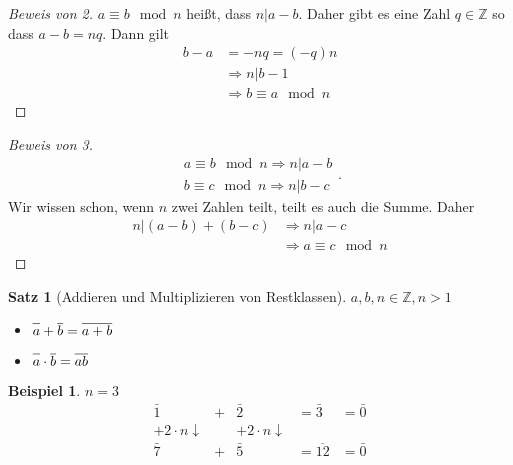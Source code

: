 \documentclass{article}
\theoremstyle{definition}
\newtheorem*{bei*}{Beispiel}
\theoremstyle{plain}
\newtheorem{sa}[definition]{Satz}
\begin{document}
\begin{proof}[Beweis von 2] 
	$ a \equiv b \mod n $ hei\ss t, dass $ n | a-b $. Daher gibt es eine Zahl $ q \in \mathbb{Z} $ so dass $ a - b = nq $. Dann gilt
	\begin{align*}
		b - a & = -nq = (-q)n \\
		& \Rightarrow n | b-1 \\
		& \Rightarrow \boxed{b \equiv a \mod n}
	\end{align*}
\end{proof}
\begin{proof}[Beweis von 3]
	\[ 
	\begin{array}{ll}
		a \equiv b \mod n \Rightarrow n | a-b \\
		b \equiv c \mod n \Rightarrow n | b-c
	\end{array}.
	 \]
	 Wir wissen schon, wenn $ n $ zwei Zahlen teilt, teilt es auch die Summe. Daher
	 \begin{align*}
	 	n | (a-b) + (b-c) & \Rightarrow n | a-c \\
	 	& \Rightarrow a \equiv c \mod n
	 \end{align*}
\end{proof}
\begin{sa}[Addieren und Multiplizieren von Restklassen]
	$ a,b,n \in \mathbb{Z}, n>1 $
	\begin{itemize}
		\item $ \overline{\vphantom{b}a} + \overline{b} = \overline{a+b} $
		\item $ \overline{\vphantom{b}a} \cdot \overline{b} = \overline{ab} $
	\end{itemize}
\end{sa}
\begin{bei*}
	$ n=3 $
	\[ 
	\begin{array}{rlrll}
		\bar{1} & + & \bar{2} & = \bar{3} & = \bar{0} \\
		+ 2 \cdot n\downarrow & & + 2 \cdot n \downarrow & & \\
		\bar{7} & + & \bar{5} & = \overline{12} & = \bar{0} 
	\end{array}
	 \]
\end{bei*}
\end{document}
